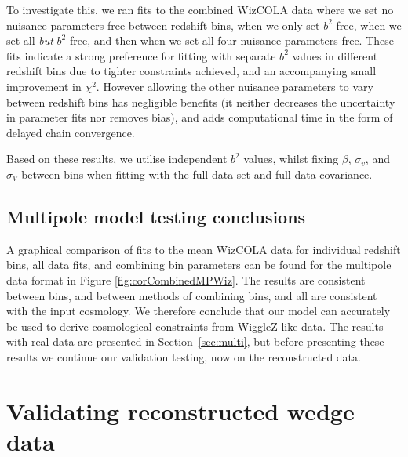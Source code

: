 \documentclass[a4paper,fleqn,usenatbib]{mnras}
\begin{document}
To investigate this, we ran fits to the combined WizCOLA data where we set no nuisance parameters free between redshift bins, when we only set $b^2$ free, when we set all \textit{but} $b^2$ free, and then when we set all four nuisance parameters free.  These fits indicate a strong preference for fitting with separate $b^2$ values in different redshift bins due to tighter constraints achieved, and an accompanying small improvement in $\chi^2$.  However allowing the other nuisance parameters to vary between redshift bins has negligible benefits (it neither decreases the uncertainty in parameter fits nor removes  bias), and adds computational time in the form of delayed chain convergence.

Based on these results, we utilise independent $b^2$ values, whilst fixing $\beta$, $\sigma_v$, and $\sigma_V$ between bins when fitting with the full data set and full data covariance.


\subsection{Multipole model testing conclusions}

 A graphical comparison of fits to the mean WizCOLA data for individual redshift bins, all data fits, and combining bin parameters can be found for the multipole data format in Figure \ref{fig:corCombinedMPWiz}. 
 The results are consistent between bins, and between methods of combining bins, and all are consistent with the input cosmology.  We therefore conclude that our model can accurately be used to derive cosmological constraints from WiggleZ-like data.  The results with real data are presented in Section~\ref{sec:multi}, but before presenting these results we continue our validation testing, now on the reconstructed data. 







\section{Validating reconstructed wedge data}
\end{document}
